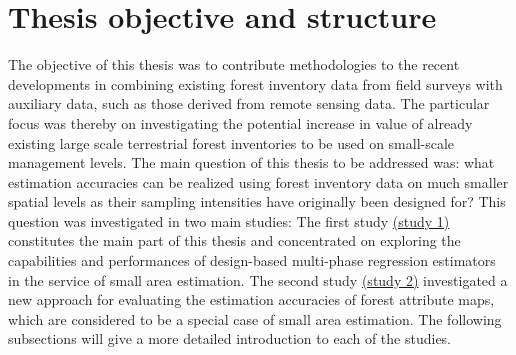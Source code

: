 






\newpage
\section{Thesis objective and structure}
\label{sec:intro:obj_and_struct}

The objective of this thesis was to contribute methodologies to the recent developments in combining existing forest inventory data from field surveys with auxiliary data, such as those derived from remote sensing data. The particular focus was thereby on investigating the potential increase in value of already existing large scale terrestrial forest inventories to be used on small-scale management levels. The main question of this thesis to be addressed was: what estimation accuracies can be realized using forest inventory data on much smaller spatial levels as their sampling intensities have originally been designed for? This question was investigated in two main studies: The first study \hyperref[sec:study1]{(study 1)} constitutes the main part of this thesis and concentrated on exploring the capabilities and performances of design-based multi-phase regression estimators in the service of small area estimation. The second study \hyperref[sec:study2]{(study 2)} investigated a new approach for evaluating the estimation accuracies of forest attribute maps, which are considered to be a special case of small area estimation. The following subsections will give a more detailed introduction to each of the studies.


